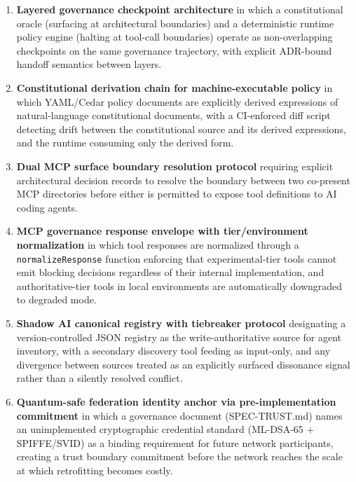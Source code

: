 \documentclass[12pt,a4paper]{article}
\theoremstyle{definition}
\theoremstyle{remark}
\begin{document}
\begin{enumerate}

  \item \textbf{Layered governance checkpoint architecture} in which a
    constitutional oracle (surfacing at architectural boundaries) and a
    deterministic runtime policy engine (halting at tool-call boundaries)
    operate as non-overlapping checkpoints on the same governance trajectory,
    with explicit ADR-bound handoff semantics between layers.

  \item \textbf{Constitutional derivation chain for machine-executable policy}
    in which YAML/Cedar policy documents are explicitly derived expressions
    of natural-language constitutional documents, with a CI-enforced diff
    script detecting drift between the constitutional source and its derived
    expressions, and the runtime consuming only the derived form.

  \item \textbf{Dual MCP surface boundary resolution protocol} requiring
    explicit architectural decision records to resolve the boundary between
    two co-present MCP directories before either is permitted to expose
    tool definitions to AI coding agents.

  \item \textbf{MCP governance response envelope with tier/environment
    normalization} in which tool responses are normalized through a
    \texttt{normalizeResponse} function enforcing that experimental-tier
    tools cannot emit blocking decisions regardless of their internal
    implementation, and authoritative-tier tools in local environments
    are automatically downgraded to degraded mode.

  \item \textbf{Shadow AI canonical registry with tiebreaker protocol}
    designating a version-controlled JSON registry as the write-authoritative
    source for agent inventory, with a secondary discovery tool feeding as
    input-only, and any divergence between sources treated as an explicitly
    surfaced dissonance signal rather than a silently resolved conflict.

  \item \textbf{Quantum-safe federation identity anchor via pre-implementation
    commitment} in which a governance document (SPEC-TRUST.md) names an
    unimplemented cryptographic credential standard (ML-DSA-65 + SPIFFE/SVID)
    as a binding requirement for future network participants, creating a
    trust boundary commitment before the network reaches the scale at which
    retrofitting becomes costly.


\end{enumerate}
\end{document}

